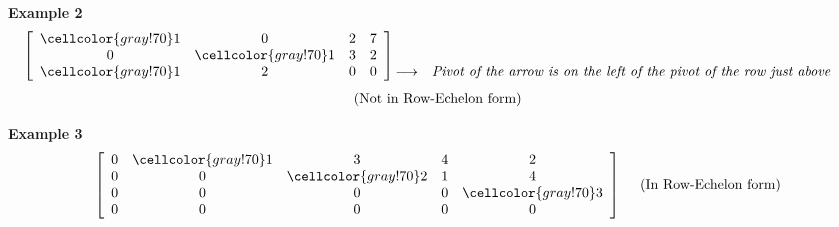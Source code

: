 \documentclass{article}
\newcommand\bg{\cellcolor{gray!70}} %
\begin{document}
\textbf{Example 2} 
\[
 \left[\begin{array}{cccc}
    \bg1 &0 &2 &7\\  
     0 &\bg1 &3 &2\\
     \bg1 &2 &0 &0
  \end{array}\right]
  \begin{matrix}
    &&\\
    &&\\
    \longrightarrow &\emph{Pivot of the arrow is on the left of the pivot of the row just above}\\
  \end{matrix}\\
\]
\begin{align}
    \centering
  \text{(Not in Row-Echelon form)} \nonumber
\end{align}


\textbf{Example 3}
\[
\left[\begin{array}{ccccc}
    0 &\bg1 &3 &4 &2\\
    0 &0 &\bg2 &1 &4\\
    0 &0 &0 &0 &\bg3\\
    0 &0 &0 &0 &0
  \end{array}\right] ~~~~  \text{(In Row-Echelon form)}
\]


\end{document}
